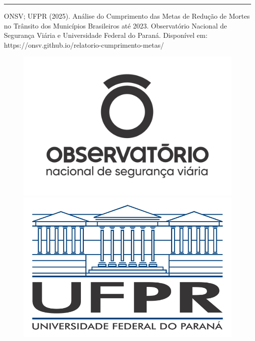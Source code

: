 \documentclass[
  letterpaper,
  DIV=11,
  numbers=noendperiod]{scrreprt}
\begin{document}

\begin{center}\rule{0.5\linewidth}{0.5pt}\end{center}

ONSV; UFPR (2025). Análise do Cumprimento das Metas de Redução de Mortes
no Trânsito dos Municípios Brasileiros até 2023. Observatório Nacional
de Segurança Viária e Universidade Federal do Paraná. Disponível em:
https://onsv.github.io/relatorio-cumprimento-metas/

\begin{figure}

\begin{minipage}{0.36\linewidth}
\begin{center}
\includegraphics{img/onsv-logo.jpg}
\end{center}
\end{minipage}%
%
\begin{minipage}{0.27\linewidth}
\begin{center}
\includegraphics{img/marca_UFPR.png}
\end{center}
\end{minipage}%

\end{figure}%
\end{document}
